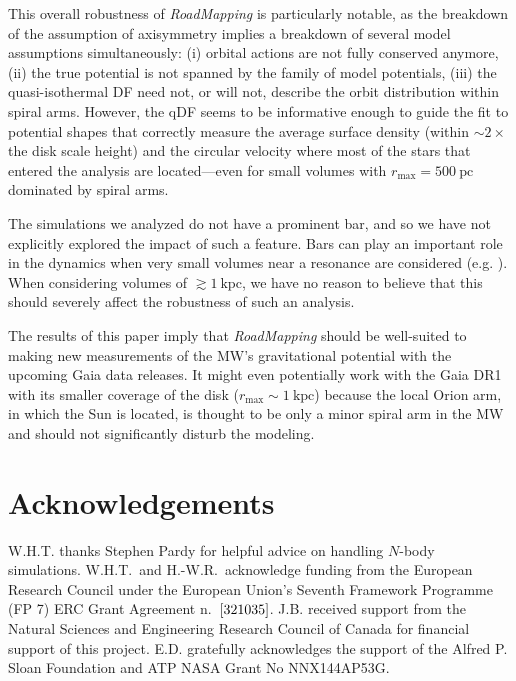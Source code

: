 \documentclass[iop,revtex4,numberedappendix,appendixfloats]{emulateapj}
\newcommand{\RM}{{\sl RoadMapping}}
\begin{document}
This overall robustness of \RM{} is particularly notable, as the breakdown of the assumption of axisymmetry implies a breakdown of several model assumptions simultaneously: (i) orbital actions are not fully conserved anymore, (ii) the true potential is not spanned by the family of model potentials, (iii) the quasi-isothermal DF need not, or will not, describe the orbit distribution within spiral arms. However, the qDF seems to be informative enough to guide the fit to potential shapes that correctly measure the average surface density (within $\sim2 \times$ the disk scale height) and the circular velocity where most of the stars that entered the analysis are located---even for small volumes with $r_\text{max}=500~\text{pc}$ dominated by spiral arms. 

The simulations we analyzed do not have a prominent bar, and so we have not explicitly explored the impact of such a feature. Bars can play an important role in the dynamics when very small volumes near a resonance are considered (e.g. \citealt{2000AJ....119..800D}). When considering volumes of $\gtrsim 1~\text{kpc}$, we have no reason to believe that this should severely affect the robustness of such an analysis.

The results of this paper imply that \RM{} should be well-suited to making new measurements of the MW's gravitational potential with the upcoming Gaia data releases. It might even potentially work with the Gaia DR1 with its smaller coverage of the disk ($r_\text{max}\sim 1~\text{kpc}$) because the local Orion arm, in which the Sun is located, is thought to be only a minor spiral arm in the MW and should not significantly disturb the modeling. 


\section{Acknowledgements}

W.H.T. thanks Stephen Pardy for helpful advice on handling $N$-body simulations. W.H.T.\ and H.-W.R.~acknowledge funding from the European Research Council under the European Union’s Seventh Framework Programme (FP 7) ERC Grant Agreement n.~${\rm [321035]}$. J.B. received support from the Natural Sciences and Engineering Research Council of Canada for financial support of this project. E.D. gratefully acknowledges the support of the Alfred P. Sloan Foundation and ATP NASA Grant No NNX144AP53G. 


{}

\end{document}
